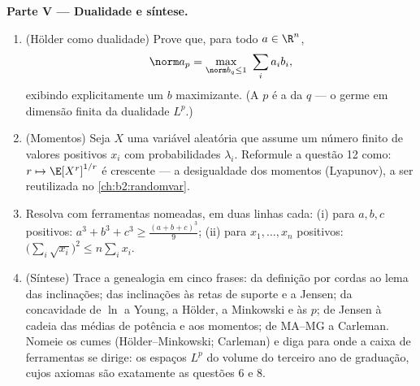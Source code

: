 \begin{problem}
\medskip
\noindent\textbf{Parte V --- Dualidade e síntese.}
\begin{enumerate}[resume]
  \item (Hölder como dualidade) Prove que, para todo $a \in
        \R^n$,
        \[
        \norm a_p = \max_{\norm b_q \leq 1}\ \sum_i a_ib_i ,
        \]
        exibindo explicitamente um $b$ maximizante. (A  $p$
        é a  da  $q$ --- o germe em dimensão finita
        da dualidade $L^p$.)
  \item (Momentos) Seja $X$ uma variável aleatória que assume um número finito
        de valores positivos $x_i$ com probabilidades
        $\lambda_i$. Reformule a questão 12 como: $r \mapsto
        \E[X^r]^{1/r}$ é crescente --- a desigualdade
        dos momentos (Lyapunov), a ser reutilizada no
        \cref{ch:b2:randomvar}.
  \item Resolva com ferramentas nomeadas, em duas linhas cada: (i) para
        $a, b, c$ positivos: $a^3 + b^3 + c^3 \geq
        \frac{(a+b+c)^3}{9}$; (ii) para $x_1, \dots,
        x_n$ positivos: $\bigl(\sum_i\sqrt{x_i}\bigr)^2 \leq
        n\sum_i x_i$.
  \item (Síntese) Trace a genealogia em cinco frases: da definição por
        cordas ao lema das inclinações; das inclinações às retas de suporte e a
        Jensen; da concavidade de $\ln$ a Young, a Hölder, a
        Minkowski e às  $p$; de Jensen à cadeia das médias
        de potência e aos momentos; de MA--MG a Carleman. Nomeie os cumes
        (Hölder--Minkowski; Carleman) e diga para onde a
        caixa de ferramentas se dirige: os espaços $L^p$ do volume do terceiro ano de
        graduação, cujos axiomas são exatamente as questões 6 e 8.
\end{enumerate}
\end{problem}

